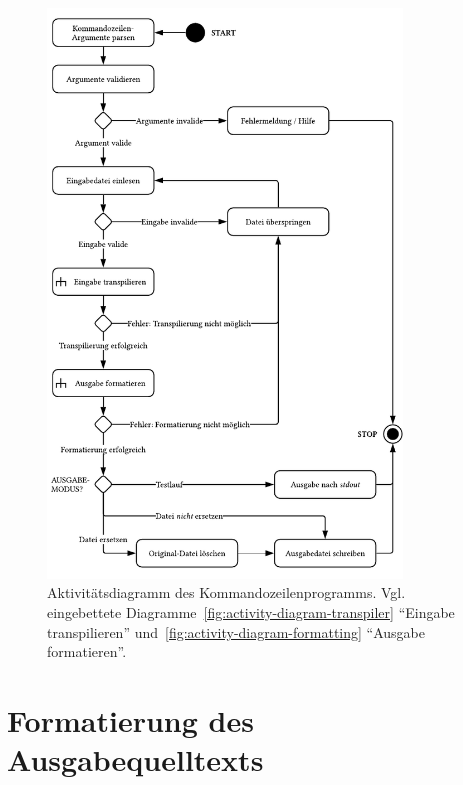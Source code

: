 \begin{figure}[p]
  \centering
  \includegraphics[width=0.84\textwidth]{src/4_Umsetzung/img/activity-diagram-transpiler-cli.pdf}
	\caption[Aktivitätsdiagramm des Kommandozeilenprogramms]{Aktivitätsdiagramm des Kommandozeilenprogramms. Vgl. eingebettete Diagramme~\ref{fig:activity-diagram-transpiler} \enquote{Eingabe transpilieren} und~\ref{fig:activity-diagram-formatting} \enquote{Ausgabe formatieren}.}
	\label{fig:activity-diagram-transpiler-cli}
\end{figure}

\section{Formatierung des Ausgabequelltexts}

